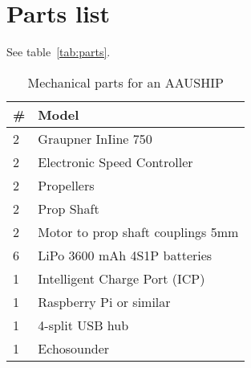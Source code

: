 \section{Parts list}
See table~\vref{tab:parts}.
\begin{table}[htbp]
	\centering
	\begin{tabularx}{\textwidth}{ll}
	\toprule
	\# &  Model \\
	\midrule
	2 & Graupner InIine 750 \\
	2 & Electronic Speed Controller \\
	2 & Propellers \\
	2 & Prop Shaft \\
	2 & Motor to prop shaft couplings 5mm\\
	6 & LiPo 3600 mAh 4S1P batteries \\
	1 & Intelligent Charge Port (ICP) \\
	1 & Raspberry Pi or similar \\
	1 & 4-split USB hub\\
	1 & Echosounder \\
	\bottomrule
	\end{tabularx}
	\caption{Mechanical parts for an AAUSHIP}
    \label{tab:parts}
\end{table}

